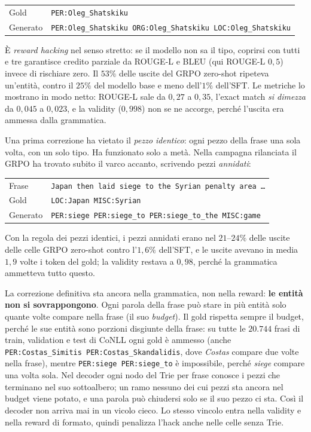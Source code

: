 \begin{center}
\small
\begin{tabular}{ll}
\toprule
Gold      & \texttt{PER:Oleg\_Shatskiku} \\
Generato  & \texttt{PER:Oleg\_Shatskiku ORG:Oleg\_Shatskiku LOC:Oleg\_Shatskiku} \\
\bottomrule
\end{tabular}
\end{center}

È \emph{reward hacking} nel senso stretto: se il modello non sa il tipo, coprirsi
con tutti e tre garantisce credito parziale da ROUGE-L e BLEU (qui ROUGE-L
$0{,}5$) invece di rischiare zero. Il $53\%$ delle uscite del GRPO zero-shot
ripeteva un'entità, contro il $25\%$ del modello base e meno dell'$1\%$
dell'SFT. Le metriche lo mostrano in modo netto: ROUGE-L sale da $0{,}27$ a
$0{,}35$, l'exact match \emph{si dimezza} da $0{,}045$ a $0{,}023$, e la validity
($0{,}998$) non se ne accorge, perché l'uscita era ammessa dalla grammatica.

Una prima correzione ha vietato il \emph{pezzo identico}: ogni pezzo della
frase una sola volta, con un solo tipo. Ha funzionato solo a metà. Nella
campagna rilanciata il GRPO ha trovato subito il varco accanto, scrivendo pezzi
\emph{annidati}:

\begin{center}
\small
\begin{tabular}{ll}
\toprule
Frase    & \texttt{Japan then laid siege to the Syrian penalty area \dots} \\
Gold     & \texttt{LOC:Japan MISC:Syrian} \\
Generato & \texttt{PER:siege PER:siege\_to PER:siege\_to\_the MISC:game} \\
\bottomrule
\end{tabular}
\end{center}

Con la regola dei pezzi identici, i pezzi annidati erano nel $21$--$24\%$ delle
uscite delle celle GRPO zero-shot contro l'$1{,}6\%$ dell'SFT, e le uscite
avevano in media $1{,}9$ volte i token del gold; la validity restava a
$0{,}98$, perché la grammatica ammetteva tutto questo.

La correzione definitiva sta ancora nella grammatica, non nella reward:
\textbf{le entità non si sovrappongono}. Ogni parola della frase può stare in
più entità solo quante volte compare nella frase (il suo \emph{budget}). Il
gold rispetta sempre il budget, perché le sue entità sono porzioni disgiunte
della frase: su tutte le $20.744$ frasi di train, validation e test di
CoNLL ogni gold è ammesso (anche \texttt{PER:Costas\_Simitis
PER:Costas\_Skandalidis}, dove \emph{Costas} compare due volte nella frase),
mentre \texttt{PER:siege PER:siege\_to} è impossibile, perché \emph{siege}
compare una volta sola. Nel decoder ogni nodo del Trie per frase conosce i
pezzi che terminano nel suo sottoalbero; un ramo nessuno dei cui pezzi sta
ancora nel budget viene potato, e una parola può chiudersi solo se il suo pezzo
ci sta. Così il decoder non arriva mai in un vicolo cieco. Lo stesso vincolo
entra nella validity e nella reward di formato, quindi penalizza l'hack anche
nelle celle senza Trie.

